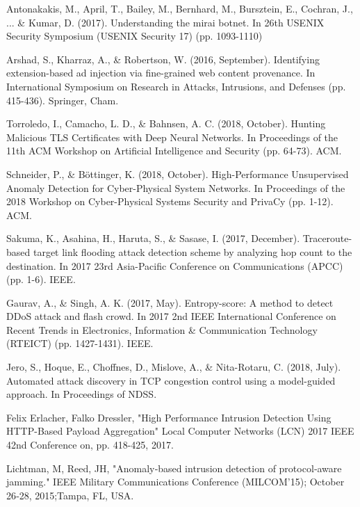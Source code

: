 \documentclass[12pt]{article} %
\begin{document}
\begin{thebibliography}{99}

 Antonakakis, M., April, T., Bailey, M., Bernhard, M., Bursztein, E., Cochran, J., ... \& Kumar, D. (2017). Understanding the mirai botnet. In 26th {USENIX} Security Symposium ({USENIX} Security 17) (pp. 1093-1110)

 Arshad, S., Kharraz, A., \& Robertson, W. (2016, September). Identifying extension-based ad injection via fine-grained web content provenance. In International Symposium on Research in Attacks, Intrusions, and Defenses (pp. 415-436). Springer, Cham.

 Torroledo, I., Camacho, L. D., \& Bahnsen, A. C. (2018, October). Hunting Malicious TLS Certificates with Deep Neural Networks. In Proceedings of the 11th ACM Workshop on Artificial Intelligence and Security (pp. 64-73). ACM.

 Schneider, P., \& Böttinger, K. (2018, October). High-Performance Unsupervised Anomaly Detection for Cyber-Physical System Networks. In Proceedings of the 2018 Workshop on Cyber-Physical Systems Security and PrivaCy (pp. 1-12). ACM.

 Sakuma, K., Asahina, H., Haruta, S., \& Sasase, I. (2017, December). Traceroute-based target link flooding attack detection scheme by analyzing hop count to the destination. In 2017 23rd Asia-Pacific Conference on Communications (APCC) (pp. 1-6). IEEE.

 Gaurav, A., \& Singh, A. K. (2017, May). Entropy-score: A method to detect DDoS attack and flash crowd. In 2017 2nd IEEE International Conference on Recent Trends in Electronics, Information \& Communication Technology (RTEICT) (pp. 1427-1431). IEEE.

 Jero, S., Hoque, E., Choffnes, D., Mislove, A., \& Nita-Rotaru, C. (2018, July). Automated attack discovery in TCP congestion control using a model-guided approach. In Proceedings of NDSS.

 Felix Erlacher, Falko Dressler, "High Performance Intrusion Detection Using HTTP-Based Payload Aggregation" Local Computer Networks (LCN) 2017 IEEE 42nd Conference on, pp. 418-425, 2017.

 Lichtman, M, Reed, JH, "Anomaly‐based intrusion detection of protocol‐aware jamming." IEEE Military Communications Conference (MILCOM'15); October 26‐28, 2015;Tampa, FL, USA.


\end{thebibliography}
\end{document}
